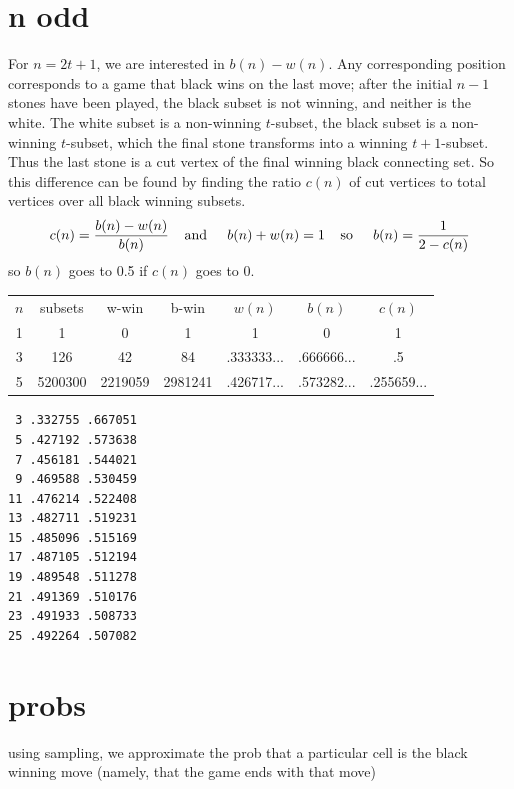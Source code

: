 \documentclass[12pt]{article}
\begin{document}
\section{n odd}
For $n=2t+1$, we are interested in $b(n)-w(n)$.
Any corresponding position corresponds 
to a game that black wins on the last move;
after the initial $n-1$ stones have been played, the
black subset is not winning, and neither is the white.
The white subset is a non-winning $t$-subset,
the black subset is a non-winning $t$-subset,
which the final stone transforms into a winning $t+1$-subset.
Thus the last stone is a cut vertex of the final winning
black connecting set.
So this difference can be found by finding the 
ratio $c(n)$ of cut vertices to total vertices over
all black winning subsets.
\[ c(n) = \frac{b(n)-w(n)}{b(n)} 
\: \: \: \: \: \mbox{\rm and } \: \: \: \: \:  
b(n) + w(n) = 1
\: \: \: \: \: \mbox{\rm so }  \: \: \: \: \: 
b(n) = \frac{1}{2 - c(n)}\] 
so $b(n)$ goes to 0.5 if $c(n)$ goes to 0.

\vfill


\begin{tabular}{ccccccc}
$n$ & subsets & w-win & b-win & $w(n)$ & $b(n)$ & $c(n)$ \\
1   &  1      &  0    & 1     & 1         & 0     &  1     \\
3   &  126    & 42    & 84    & .333333... & .666666... & .5 \\
5   &  5200300 &  2219059 & 2981241 & .426717... & .573282... & .255659... 
\end{tabular}

\vfill


\begin{verbatim}
 3 .332755 .667051
 5 .427192 .573638
 7 .456181 .544021
 9 .469588 .530459
11 .476214 .522408
13 .482711 .519231
15 .485096 .515169
17 .487105 .512194
19 .489548 .511278
21 .491369 .510176
23 .491933 .508733
25 .492264 .507082
\end{verbatim}
\newpage
\vspace*{-3cm}

\newpage
\section{probs}
using sampling, we approximate the prob that a particular
cell is the black winning move (namely, that the game ends with that move)
\end{document}
